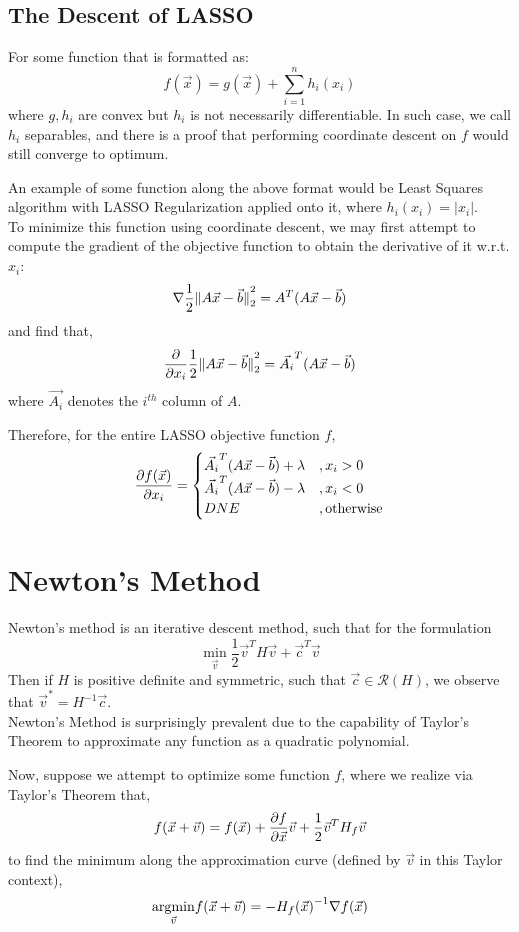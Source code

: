 \subsection{The Descent of LASSO}
For some function that is formatted as:
\[
    f(\vec{x}) = g(\vec{x}) + \sum_{i = 1}^n h_i (x_i)
\]
where $g, h_i$ are convex but $h_i$ is not necessarily differentiable.
In such case, we call $h_i$ separables, and there is a proof that performing coordinate descent on $f$ would still converge to optimum.

An example of some function along the above format would be Least Squares algorithm with LASSO Regularization applied onto it, where $h_i(x_i) = |x_i|$. \\
To minimize this function using coordinate descent, we may first attempt to compute the gradient of the objective function to obtain the derivative of it w.r.t. $x_i$:
\[
    \nabla \frac{1}{2} \pnorm[2]{A \vec{x} - \vec{b}}{2} = A^T (A \vec{x} - \vec{b})
\]
and find that,
\[
    \frac{\partial}{\partial x_i} \frac{1}{2} \pnorm[2]{A \vec{x} - \vec{b}}{2} = \vec{A_i}^T (A \vec{x} - \vec{b})
\]
where $\vec{A_i}$ denotes the $i^{th}$ column of $A$.

Therefore, for the entire LASSO objective function $f$,
\[
    \pdv{f(\vec{x})}{x_i} =
    \begin{cases}
        \vec{A_i}^T (A \vec{x} - \vec{b}) + \lambda &, x_i > 0 \\
        \vec{A_i}^T (A \vec{x} - \vec{b}) - \lambda &, x_i < 0 \\
        DNE &, \text{otherwise}
    \end{cases}
\]

\section{Newton's Method}
Newton's method is an iterative descent method, such that for the formulation
\[
    \min_{\vec{v}} \frac{1}{2} \vec{v}^T H \vec{v} + \vec{c}^T \vec{v}
\]
Then if $H$ is positive definite and symmetric, such that $\vec{c} \in \mathcal{R}(H)$, we observe that $\vec{v}^* = H^{-1} \vec{c}$. \\
Newton's Method is surprisingly prevalent due to the capability of Taylor's Theorem to approximate any function as a quadratic polynomial.

Now, suppose we attempt to optimize some function $f$, where we realize via Taylor's Theorem that,
\[
    f(\vec{x} + \vec{v}) = f(\vec{x}) + \pdv{f}{\vec{x}} \vec{v} + \frac{1}{2} \vec{v}^T H_f \vec{v}
\]
to find the minimum along the approximation curve (defined by $\vec{v}$ in this Taylor context), 
\[
    \underset{\vec{v}}{\rm argmin} f(\vec{x} + \vec{v}) = -{H_f(\vec{x})}^{-1} \nabla f(\vec{x})
\]

